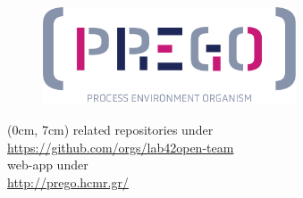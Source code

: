\documentclass{beamer}
\begin{document}


   \begin{frame}
      
      \begin{figure}
         \includegraphics[width=75mm]{resources/prego_logo.png}
      \end{figure}

      \begin{textblock*}{12cm}(0cm, 7cm)
         \centering
         \small related repositories under \\
         \small \href{https://github.com/orgs/lab42open-team}{https://github.com/orgs/lab42open-team} \\ 
         \small web-app under\\
         \small \href{http://prego.hcmr.gr/}{http://prego.hcmr.gr/}
      \end{textblock*}

   \end{frame}
   \fi
\end{document}
